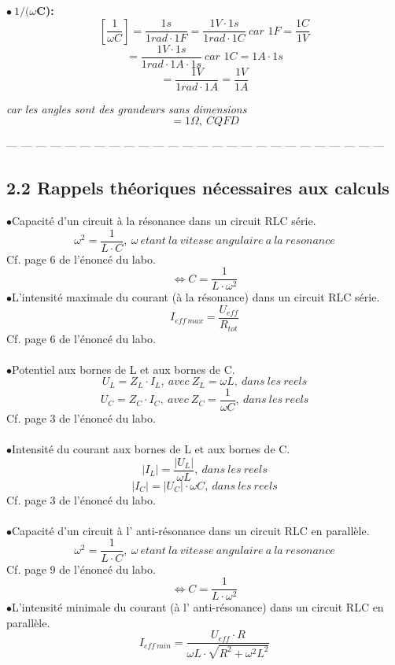 \documentclass{report}
\begin{document}
\textbf{$\bullet\ 1/(\omega$C):} \\
$$[\frac{1}{\omega C}] = \frac{1s}{1rad\cdot 1F} = \frac{1V\cdot 1s}{1rad\cdot 1C}\ \textit{car\ } 1F = \frac{1C}{1V}$$ 
$$ = \frac{1V\cdot 1s}{1rad\cdot 1A\cdot 1s}\ \textit{car\ } 1C = 1A\cdot 1s $$
$$= \frac{1V}{1rad\cdot 1A} = \frac{1V}{1A}$$ \begin{center}
\textit{car les angles sont des grandeurs sans dimensions} 
$$ = 1\Omega,\ CQFD $$
\end{center}
--- --- --- --- --- --- --- --- --- --- --- --- --- --- --- --- --- --- --- --- --- --- --- --- --- ---\\

\subsection*{2.2 Rappels th\'eoriques n\'ecessaires aux calculs}
$\bullet$Capacit\'e d'un circuit \`a la r\'esonance dans un circuit RLC s\'erie.
$$ \omega^{2} = \frac{1}{L \cdot C},\ \omega \ etant\ la\ vitesse\ angulaire\ a\ la\ resonance $$
\hspace*{0.2cm}Cf. page 6 de l'\'enonc\'e du labo.
$$ \Longleftrightarrow C = \frac{1}{L \cdot \omega^{2}} $$
$\bullet$L'intensit\'e maximale du courant (\`a la r\'esonance) dans un circuit RLC s\'erie.
$$ I_{eff\ max} = \frac{U_{eff}}{R_{tot}} $$ 
\hspace*{0.2cm}Cf. page 6 de l'\'enonc\'e du labo.\\ ~~\\
$\bullet$Potentiel aux bornes de L et aux bornes de C.
$$ U_{L} = Z_{L}\cdot I_{L},\ avec\ Z_{L} = \omega L,\ dans\ les\ reels $$ 
$$ U_{C} = Z_{C}\cdot I_{C},\ avec\ Z_{C} = \frac{1}{\omega C},\ dans\ les\ reels $$
\hspace*{0.2cm}Cf. page 3 de l'\'enonc\'e du labo.\\ ~~\\
$\bullet$Intensit\'e du courant aux bornes de L et aux bornes de C.
$$ \vert I_{L}\vert = \frac{\vert U_{L} \vert}{\omega L},\ dans\ les\ reels $$ 
$$ \vert I_{C}\vert = \vert U_{C} \vert \cdot \omega C,\ dans\ les\ reels $$
\hspace*{0.2cm}Cf. page 3 de l'\'enonc\'e du labo.\\ ~~\\
$\bullet$Capacit\'e d'un circuit \`a l' anti-r\'esonance dans un circuit RLC en parall\`ele.
$$ \omega^{2} = \frac{1}{L \cdot C},\ \omega \ etant\ la\ vitesse\ angulaire\ a\ la\ resonance $$
\hspace*{0.2cm}Cf. page 9 de l'\'enonc\'e du labo.
$$ \Longleftrightarrow C = \frac{1}{L \cdot \omega^{2}} $$
$\bullet$L'intensit\'e minimale du courant (\`a l' anti-r\'esonance) dans un circuit RLC en parall\`ele.
$$ I_{eff\ min} = \frac{U_{eff} \cdot R}{\omega L \cdot \sqrt{R^{2} + \omega^{2} L^{2}}} $$ 
\newpage
\end{document}
